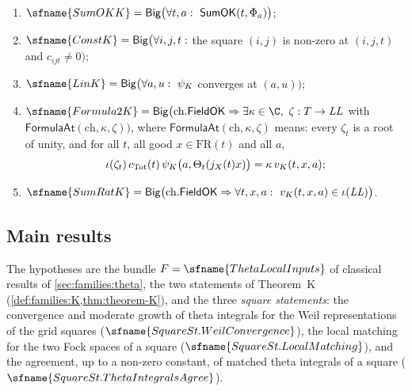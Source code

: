 \begin{definition}\label{def:pf:rowprops:five}
\begin{enumerate}[label=(\alph*)]
\item $\sfname{SumOKK}=\rowpropsBig\bigl(\forall t,a:\ \mathsf{SumOK}(t,\Phi_a)\bigr)$;
\item $\sfname{ConstK}=\rowpropsBig\bigl(\forall i,j,t:$ the square $(i,j)$ is non-zero at $(i,j,t)$ and
$c_{ijt}\ne0\bigr)$;
\item $\sfname{LinK}=\rowpropsBig\bigl(\forall a,u:\ \psi_K$ converges at $(a,u)\bigr)$;
\item $\sfname{Formula2K}=\rowpropsBig\bigl(\mathrm{ch}.\mathsf{FieldOK}\Rightarrow\exists\kappa\in\C,\
\zeta:T\to\rowpropsLL$ with $\mathsf{FormulaAt}(\mathrm{ch},\kappa,\zeta)\bigr)$, where $\mathsf{FormulaAt}(\mathrm{ch},\kappa,\zeta)$
means: every $\zeta_t$ is a root of unity, and for all $t$, all good $x\in\mathrm{FR}(t)$ and all $a$,
\[
\iota(\zeta_t)\,c_{\mathrm{Tot}}(t)\,\psi_K\bigl(a,\Theta_t(j_X(t)x)\bigr)=\kappa\,v_K(t,x,a);
\]
\item $\sfname{SumRatK}=\rowpropsBig\bigl(\mathrm{ch}.\mathsf{FieldOK}\Rightarrow\forall t,x,a:\
v_K(t,x,a)\in\rowpropsemb(\rowpropsLL)\bigr)$.
\end{enumerate}
\end{definition}

\subsection{Main results}\label{sec:pf:rowprops:results}

The hypotheses are the bundle $F=\sfname{ThetaLocalInputs}$ of classical results of \cref{sec:families:theta}, the two
statements of Theorem~K (\cref{def:families:K,thm:theorem-K}), and the three \emph{square statements}: the
convergence and moderate growth of theta integrals for the Weil representations of the grid squares
($\sfname{SquareSt.WeilConvergence}$), the local matching for the two Fock spaces of a square
($\sfname{SquareSt.LocalMatching}$), and the agreement, up to a non-zero constant, of matched theta integrals of a
square ($\sfname{SquareSt.ThetaIntegralsAgree}$).

